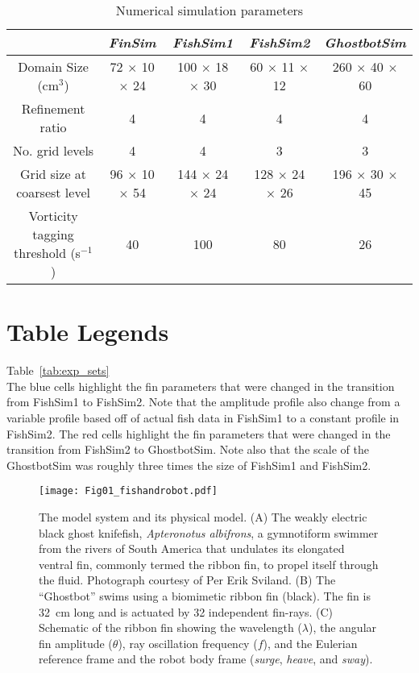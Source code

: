 \documentclass[onecolumn]{IEEEtran}
\begin{document}
\newpage
\begin{table}
 \centering
  \begin{tabular}{|c|c|c|c|c|}
    \hline
		& \emph{FinSim}
		& \emph{FishSim1}
		& \emph{FishSim2}
		& \emph{GhostbotSim}\\
   \hline
   \hline
  Domain Size (cm$^3$) & 72 $\times$ 10 $\times$ 24 & 100 $\times$ 18 $\times$ 30 & 60 $\times$ 11 $\times$ 12 & 260 $\times$ 40 $\times$ 60 \\
  Refinement ratio  & 4  & 4 & 4 & 4\\
  No. grid levels   & 4  & 4 & 3 & 3 \\
  Grid size at coarsest level & 96 $\times$ 10 $\times$ 54  & 144 $\times$ 24 $\times$ 24 & 128 $\times$ 24 $\times$ 26 & 196 $\times$ 30 $\times$ 45  \\
  Vorticity tagging threshold (s$^{-1}$)& 40 & 100 & 80 & 26 \\ 
 \hline    
  \end{tabular}
\caption{Numerical simulation parameters}
 \label{tab:sim_par}
 
\end{table}

\section*{Table Legends}
Table~\ref{tab:exp_sets}\\
The blue cells highlight the fin parameters that were changed in the transition from FishSim1 to FishSim2.  Note that the amplitude profile also change from a variable profile based off of actual fish data in FishSim1 to a constant profile in FishSim2.  The red cells highlight the fin parameters that were changed in the transition from FishSim2 to GhostbotSim.  Note also that the scale of the GhostbotSim was roughly three times the size of FishSim1 and FishSim2.





\newpage \begin{figure} \centering
\texttt{[image: Fig01\_fishandrobot.pdf]} \caption{The model
system and its physical model. 
(A) The weakly electric black ghost
knifefish, \emph{Apteronotus albifrons}, a gymnotiform swimmer from the
rivers of South America that undulates its elongated ventral fin, commonly
termed the ribbon fin, to propel itself through the fluid. Photograph
courtesy of Per Erik Sviland. 
(B) The ``Ghostbot'' swims using a
biomimetic ribbon fin (black). The fin is 32~cm long and is actuated by 32
independent fin-rays. 
(C) Schematic of the ribbon fin showing the
wavelength ($\lambda$), the angular fin amplitude ($\theta$), ray
oscillation frequency ($f$), and the Eulerian reference frame and the
robot body frame (\emph{surge}, \emph{heave}, and \emph{sway}).}
\label{fig:fish_robot} \end{figure} \clearpage \newpage
\end{document}
